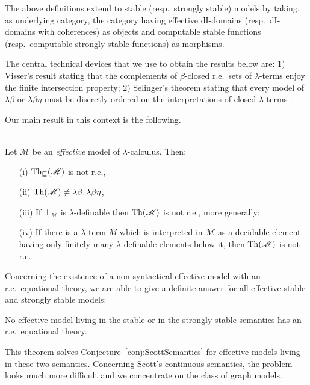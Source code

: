 \documentclass[english]{llncs}
\newcommand{\lm}[1]{\mathscr{#1}} \newcommand{\Lint}[1]{\Lbrack #1\Rbrack} \newcommand{\ca}[1]{\mathscr{#1}} \newcommand{\Int}[1]{\vert #1\vert}
\begin{document}
The above definitions extend to stable (resp.\ strongly stable) models by taking, as underlying category, the category having effective 
dI-domains (resp.\ dI-domains with coherences) as objects and computable stable functions (resp.\ computable strongly stable functions) as morphisms.

The central technical devices that we use to obtain the results below are:
$1)$ Visser's result \cite{Visser80} stating that the complements of $\beta$-closed r.e.\ sets of $\lambda$-terms enjoy the finite intersection property; 
$2)$ Selinger's theorem stating that every model of $\lambda\beta$ or $\lambda\beta\eta$ must be discretly ordered on the interpretations 
of closed $\lambda$-terms \cite{Selinger03}. 

Our main result in this context is the following.

\begin{theorem} \cite[Cor.~6.2.47, Cor.~6.2.49, Prop.~6.2.40, Thm.~6.2.44]{ManzonettoTh}\\
Let $\lm{M}$ be an \emph{effective} model of $\lambda$-calculus. Then:
\begin{itemize}
\item[(i)] $\Thle{\lm{M}}$ is not r.e.,
\item[(ii)] $\Th{\lm{M}}\neq\lambda\beta,\lambda\beta\eta$,
\item[(iii)] If $\bot_{\lm{M}}$ is $\lambda$-definable then $\Th{\lm{M}}$ is not r.e., more generally:
\item[(iv)] If there is a $\lambda$-term $M$ which is interpreted in $\lm{M}$ as a decidable element having only finitely many 
$\lambda$-definable elements below it, then $\Th{\lm{M}}$ is not r.e.
\end{itemize}
\end{theorem}

Concerning the existence of a non-syntactical effective model with an r.e.\ equational theory, we are able to give a definite answer for all effective stable and strongly stable models:

\begin{theorem} \cite[Thm.~6.3.2]{ManzonettoTh}
No effective model living in the stable or in the strongly stable semantics has an r.e.\ equational theory.
\end{theorem}

This theorem solves Conjecture~\ref{conj:ScottSemantics} for effective models living in these two semantics. 
Concerning Scott's continuous semantics, the problem looks much more difficult and we concentrate on the class of graph models.
\end{document}
